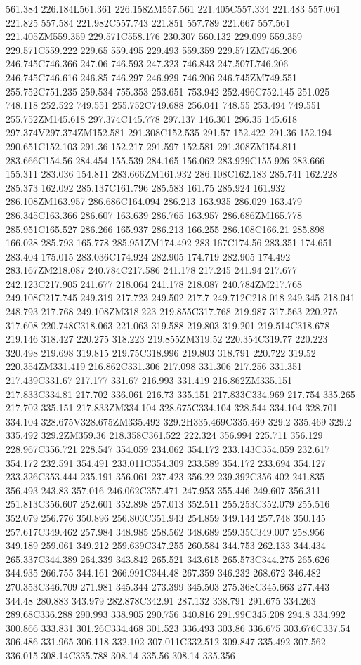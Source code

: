 561.384 226.184L561.361 226.158ZM557.561 221.405C557.334 221.483 557.061 221.825 557.584 221.982C557.743 221.851 557.789 221.667 557.561 221.405ZM559.359 229.571C558.176 230.307 560.132 229.099 559.359 229.571C559.222 229.65 559.495 229.493 559.359 229.571ZM746.206 246.745C746.366 247.06 746.593 247.323 746.843 247.507L746.206 246.745C746.616 246.85 746.297 246.929 746.206 246.745ZM749.551 255.752C751.235 259.534 755.353 253.651 753.942 252.496C752.145 251.025 748.118 252.522 749.551 255.752C749.688 256.041 748.55 253.494 749.551 255.752ZM145.618 297.374C145.778 297.137 146.301 296.35 145.618 297.374V297.374ZM152.581 291.308C152.535 291.57 152.422 291.36 152.194 290.651C152.103 291.36 152.217 291.597 152.581 291.308ZM154.811 283.666C154.56 284.454 155.539 284.165 156.062 283.929C155.926 283.666 155.311 283.036 154.811 283.666ZM161.932 286.108C162.183 285.741 162.228 285.373 162.092 285.137C161.796 285.583 161.75 285.924 161.932 286.108ZM163.957 286.686C164.094 286.213 163.935 286.029 163.479 286.345C163.366 286.607 163.639 286.765 163.957 286.686ZM165.778 285.951C165.527 286.266 165.937 286.213 166.255 286.108C166.21 285.898 166.028 285.793 165.778 285.951ZM174.492 283.167C174.56 283.351 174.651 283.404 175.015 283.036C174.924 282.905 174.719 282.905 174.492 283.167ZM218.087 240.784C217.586 241.178 217.245 241.94 217.677 242.123C217.905 241.677 218.064 241.178 218.087 240.784ZM217.768 249.108C217.745 249.319 217.723 249.502 217.7 249.712C218.018 249.345 218.041 248.793 217.768 249.108ZM318.223 219.855C317.768 219.987 317.563 220.275 317.608 220.748C318.063 221.063 319.588 219.803 319.201 219.514C318.678 219.146 318.427 220.275 318.223 219.855ZM319.52 220.354C319.77 220.223 320.498 219.698 319.815 219.75C318.996 219.803 318.791 220.722 319.52 220.354ZM331.419 216.862C331.306 217.098 331.306 217.256 331.351 217.439C331.67 217.177 331.67 216.993 331.419 216.862ZM335.151 217.833C334.81 217.702 336.061 216.73 335.151 217.833C334.969 217.754 335.265 217.702 335.151 217.833ZM334.104 328.675C334.104 328.544 334.104 328.701 334.104 328.675V328.675ZM335.492 329.2H335.469C335.469 329.2 335.469 329.2 335.492 329.2ZM359.36 218.358C361.522 222.324 356.994 225.711 356.129 228.967C356.721 228.547 354.059 234.062 354.172 233.143C354.059 232.617 354.172 232.591 354.491 233.011C354.309 233.589 354.172 233.694 354.127 233.326C353.444 235.191 356.061 237.423 356.22 239.392C356.402 241.835 356.493 243.83 357.016 246.062C357.471 247.953 355.446 249.607 356.311 251.813C356.607 252.601 352.898 257.013 352.511 255.253C352.079 255.516 352.079 256.776 350.896 256.803C351.943 254.859 349.144 257.748 350.145 257.617C349.462 257.984 348.985 258.562 348.689 259.35C349.007 258.956 349.189 259.061 349.212 259.639C347.255 260.584 344.753 262.133 344.434 265.337C344.389 264.339 343.842 265.521 343.615 265.573C344.275 265.626 344.935 266.755 344.161 266.991C344.48 267.359 346.232 268.672 346.482 270.353C346.709 271.981 345.344 273.399 345.503 275.368C345.663 277.443 344.48 280.883 343.979 282.878C342.91 287.132 338.791 291.675 334.263 289.68C336.288 290.993 338.905 290.756 340.816 291.99C345.208 294.8 334.992 300.866 333.831 301.26C334.468 301.523 336.493 303.86 336.675 303.676C337.54 306.486 331.965 306.118 332.102 307.011C332.512 309.847 335.492 307.562 336.015 308.14C335.788 308.14 335.56 308.14 335.356 